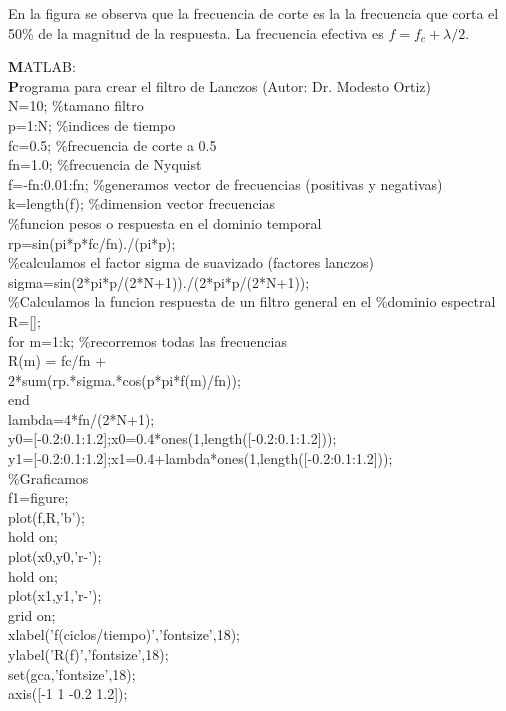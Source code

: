 \documentclass[
]{agujournal2019}
\begin{document}
\begin{center}
\end{center}

En la figura se observa que la frecuencia de corte es la la frecuencia
que corta el 50\% de la magnitud de la respuesta. La frecuencia efectiva
es \(f=f_c+\lambda/2\).

\begin{framed}
{\noindent \textbf MATLAB:}\\
{\textbf Programa para crear el filtro de Lanczos (Autor: Dr. Modesto Ortiz)}\\
{\noindent}N=10;   \%tamano filtro\\
p=1:N;  \%indices de tiempo \\
fc=0.5; \%frecuencia de corte a 0.5\\
fn=1.0; \%frecuencia de Nyquist \\
f=-fn:0.01:fn; \%generamos vector de frecuencias (positivas y negativas)\\
k=length(f);   \%dimension vector frecuencias \\
\%funcion pesos o respuesta en el dominio temporal\\
rp=sin(pi*p*fc/fn)./(pi*p);\\
\%calculamos el factor sigma de suavizado (factores lanczos)\\
sigma=sin(2*pi*p/(2*N+1))./(2*pi*p/(2*N+1)); \\
\%Calculamos la funcion respuesta de un filtro general en el
\%dominio espectral\\
R=[];\\
for m=1:k; \%recorremos todas las frecuencias\\
    R(m) = fc/fn + \\
    2*sum(rp.*sigma.*cos(p*pi*f(m)/fn));\\
end\\
lambda=4*fn/(2*N+1);\\
y0=[-0.2:0.1:1.2];x0=0.4*ones(1,length([-0.2:0.1:1.2]));\\
y1=[-0.2:0.1:1.2];x1=0.4+lambda*ones(1,length([-0.2:0.1:1.2]));\\
\%Graficamos\\
f1=figure;\\
plot(f,R,'b'); \\
hold on;\\
plot(x0,y0,'r-');\\
hold on;\\
plot(x1,y1,'r-');\\
grid on;\\
xlabel('f(ciclos/tiempo)','fontsize',18);\\
ylabel('R(f)','fontsize',18);\\
set(gca,'fontsize',18);\\
axis([-1 1 -0.2 1.2]);\\
\end{framed}
\end{document}
